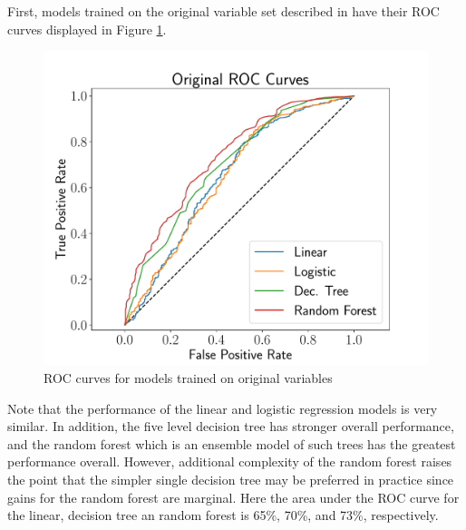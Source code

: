 \documentclass[10pt]{article}
\begin{document}
First, models trained on the original variable set described in \cite{Smart2016} 
have their ROC curves displayed in Figure \ref{fig:orgroc}.
%
\begin{figure}[thb]
    \centering
	\includegraphics[width=1.0\linewidth]{oriROC.pdf}
	\caption{ROC curves for models trained on original variables}
	\label{fig:orgroc}
\end{figure}
%
Note that the performance of the linear and logistic regression models is very similar. 
In addition, the five level decision tree has stronger overall performance, and the 
random forest which is an ensemble model of such trees has the greatest performance overall.
However, additional complexity of the random forest raises the point that the simpler 
single decision tree may be preferred in practice since gains for the random forest 
are marginal.  Here the area under the ROC curve for the linear, decision tree an random forest 
is 65\%, 70\%, and 73\%, respectively.  
\end{document}
